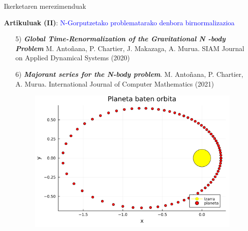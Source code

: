\documentclass[
 10pt,%
 compress,%
 t,       %
 xcolor=svgnames
]{beamer}
\theoremstyle{definition} \newtheorem{definicion}{Definicion}[section]
\theoremstyle{propiedades} \newtheorem{propiedades}{Propiedades}[section]
\begin{document}
\begin{frame}{Ikerketaren merezimenduak} 
	
	\medskip
	\textbf{Artikuluak (II)}: \textcolor{blue}{N-Gorputzetako problematarako denbora birnormalizazioa}
	\small
	
	
	\medskip
    \begin{itemize}
    
        \medskip
        \item[5)] \textbf{\textit{Global Time-Renormalization of the Gravitational N -body Problem}}
    M. Antoñana, P. Chartier, J. Makazaga, A. Murua. SIAM Journal on Applied Dynamical Systems (2020) 
    
        \medskip
    
    	\item[6)] \textbf{\textit{Majorant series for the N-body problem}}. M. Antoñana, P. Chartier, A. Murua. International Journal of Computer Mathematics (2021)    
    	
    
    \medskip
    	\begin{figure}
    		\quad
    		\begin{minipage}{.8\textwidth}
    			\colorbox{white}  {\includegraphics[width=0.7\linewidth]{sateliteae076}}
    		\end{minipage}
    	\end{figure}
    	
    	
    	  
    \end{itemize}
    
    
\end{frame}
\end{document}
